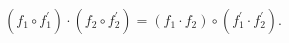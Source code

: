 \begin{equation}
\label{eq_exchange2}
  (f_1\circ f_1^\prime)\cdot (f_2\circ f_2^\prime)
  = (f_1\cdot f_2)\circ(f_1^\prime\cdot f_2^\prime).
\end{equation}

